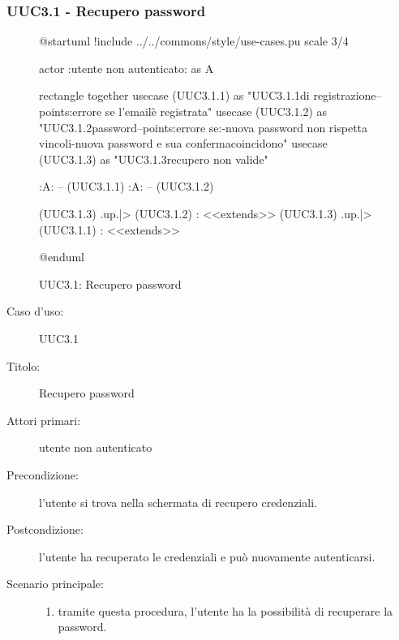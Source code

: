 \documentclass[casi-duso]{subfiles}
\begin{document}
\subsubsection{UUC3.1 - Recupero password}%
\label{subsub:UUC3.1utente}

\begin{figure}[h!] 
  \centering 
  \begin{plantuml}
  @startuml
  !include ../../commons/style/use-cases.pu
  scale 3/4

  actor :utente non autenticato: as A

  rectangle {
    together {
      usecase (UUC3.1.1) as "UUC3.1.1\nInserimento\nemail di registrazione\n--\nExtension points:\nVisualizzazione errore se l'email\nnon è registrata"
      usecase (UUC3.1.2) as "UUC3.1.2\nReimpostazione password\n--\nExtension points:\nVisualizzazione errore se:\n-nuova password non rispetta vincoli\n-nuova password e sua conferma\nnon coincidono"  
      usecase (UUC3.1.3) as "UUC3.1.3\nInformazioni recupero non valide" 
    }
  }

  :A: -- (UUC3.1.1)
  :A: -- (UUC3.1.2)

  (UUC3.1.3) .up.|> (UUC3.1.2) : <<extends>>
  (UUC3.1.3) .up.|> (UUC3.1.1) : <<extends>>

  @enduml  
  \end{plantuml} 
  \caption{UUC3.1: Recupero password} 
  \label{fig:uuc3_1} 
\end{figure}

\begin{description}
  \item[Caso d’uso:] UUC3.1
  \item[Titolo:] Recupero password
  \item[Attori primari:] utente non autenticato
  \item[Precondizione:] l'utente si trova nella schermata di recupero credenziali.
  \item[Postcondizione:] l'utente ha recuperato le credenziali e può nuovamente autenticarsi.
  \item[Scenario principale:]
        \begin{enumerate}
          \item tramite questa procedura, l'utente ha la possibilità di recuperare la password.
        \end{enumerate}
\end{description}

\end{document}
